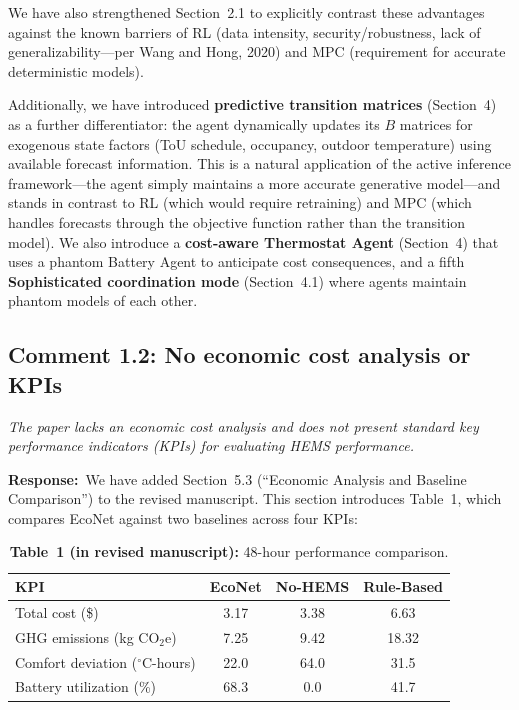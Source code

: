\documentclass[11pt]{article}
\newcommand{\reviewercomment}[1]{\textit{#1}}
\newcommand{\response}{\textbf{Response:}\ }
\begin{document}
We have also strengthened Section~2.1 to explicitly contrast these advantages against the known barriers of RL (data intensity, security/robustness, lack of generalizability---per Wang and Hong, 2020) and MPC (requirement for accurate deterministic models).

Additionally, we have introduced \textbf{predictive transition matrices} (Section~4) as a further differentiator: the agent dynamically updates its $B$ matrices for exogenous state factors (ToU schedule, occupancy, outdoor temperature) using available forecast information. This is a natural application of the active inference framework---the agent simply maintains a more accurate generative model---and stands in contrast to RL (which would require retraining) and MPC (which handles forecasts through the objective function rather than the transition model). We also introduce a \textbf{cost-aware Thermostat Agent} (Section~4) that uses a phantom Battery Agent to anticipate cost consequences, and a fifth \textbf{Sophisticated coordination mode} (Section~4.1) where agents maintain phantom models of each other.

\subsection*{Comment 1.2: No economic cost analysis or KPIs}

\reviewercomment{The paper lacks an economic cost analysis and does not present standard key performance indicators (KPIs) for evaluating HEMS performance.}

\response We have added Section~5.3 (``Economic Analysis and Baseline Comparison'') to the revised manuscript. This section introduces Table~1, which compares EcoNet against two baselines across four KPIs:

\begin{table}[h]
\centering
\caption*{\textbf{Table~1 (in revised manuscript):} 48-hour performance comparison.}
\begin{tabular}{lccc}
\toprule
\textbf{KPI} & \textbf{EcoNet} & \textbf{No-HEMS} & \textbf{Rule-Based} \\
\midrule
Total cost (\$) & 3.17 & 3.38 & 6.63 \\
GHG emissions (kg CO$_2$e) & 7.25 & 9.42 & 18.32 \\
Comfort deviation ($^\circ$C-hours) & 22.0 & 64.0 & 31.5 \\
Battery utilization (\%) & 68.3 & 0.0 & 41.7 \\
\bottomrule
\end{tabular}
\end{table}
\end{document}
